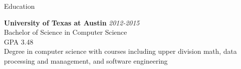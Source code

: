 \documentclass{resume} %
\begin{document}

\begin{rSection}{Education}

{\bf University of Texas at Austin} \hfill {\em 2012-2015} \\
Bachelor of Science in Computer Science \smallskip \\
GPA 3.48 \smallskip \\
Degree in computer science with courses including upper division math, data processing and management, and software engineering

\end{rSection}
\end{document}
